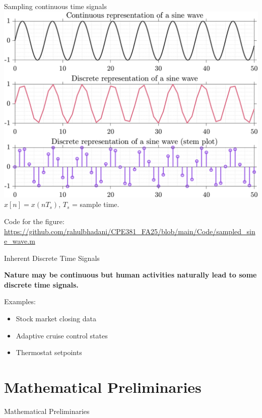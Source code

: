 \documentclass[aspectratio=169,xcolor=dvipsnames,svgnames,x11names,fleqn]{beamer}
\begin{document}
\begin{frame}{Sampling continuous time signals}
\centering
    \includegraphics[width=0.55\linewidth, trim=0 0 0 0cm,clip]{figures/sampled_sine_wave.png} $x[n] = x(nT_s)$,
$T_s$ = sample time.
    
    \tiny
    Code for the figure: \url{https://github.com/rahulbhadani/CPE381_FA25/blob/main/Code/sampled_sine_wave.m}
\end{frame}

\begin{frame}{Inherent Discrete Time Signals}
    \begin{center}
         \textbf{Nature may be continuous but human activities naturally lead to some discrete time signals.} 
    \end{center}
   
    
    Examples:
    \begin{itemize}
        \item Stock market closing data
        \item Adaptive cruise control states
        \item Thermostat setpoints
    \end{itemize}
\end{frame}

\section{Mathematical Preliminaries}


\begin{frame}{}
    \begin{center}
    \Huge \bf \color{DarkBlue}
    \faCalculator
    
    Mathematical Preliminaries
\end{center}
\end{frame}
\end{document}

